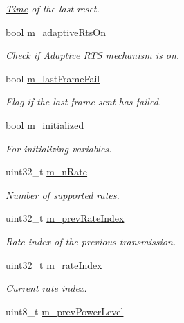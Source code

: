 \begin{DoxyCompactItemize}
\begin{DoxyCompactList}\small\item\em \hyperlink{classns3_1_1Time}{Time} of the last reset. \end{DoxyCompactList}\item 
bool \hyperlink{structns3_1_1RrpaaWifiRemoteStation_aadd0a82c0315fef3f1ae567bed1612c2}{m\+\_\+adaptive\+Rts\+On}
\begin{DoxyCompactList}\small\item\em Check if Adaptive R\+TS mechanism is on. \end{DoxyCompactList}\item 
bool \hyperlink{structns3_1_1RrpaaWifiRemoteStation_ac3e75c02498f6e4f05e4cbc8d038b2e0}{m\+\_\+last\+Frame\+Fail}
\begin{DoxyCompactList}\small\item\em Flag if the last frame sent has failed. \end{DoxyCompactList}\item 
bool \hyperlink{structns3_1_1RrpaaWifiRemoteStation_a28f5b71d7c9a1b1d35b8763273e2c527}{m\+\_\+initialized}
\begin{DoxyCompactList}\small\item\em For initializing variables. \end{DoxyCompactList}\item 
uint32\+\_\+t \hyperlink{structns3_1_1RrpaaWifiRemoteStation_afd24ca662ce9d0a0a646cd455b801a54}{m\+\_\+n\+Rate}
\begin{DoxyCompactList}\small\item\em Number of supported rates. \end{DoxyCompactList}\item 
uint32\+\_\+t \hyperlink{structns3_1_1RrpaaWifiRemoteStation_a4c0e4468c26422633983d7411a8b4b71}{m\+\_\+prev\+Rate\+Index}
\begin{DoxyCompactList}\small\item\em Rate index of the previous transmission. \end{DoxyCompactList}\item 
uint32\+\_\+t \hyperlink{structns3_1_1RrpaaWifiRemoteStation_ad006a058d80633032d4751dada11dfa3}{m\+\_\+rate\+Index}
\begin{DoxyCompactList}\small\item\em Current rate index. \end{DoxyCompactList}\item 
uint8\+\_\+t \hyperlink{structns3_1_1RrpaaWifiRemoteStation_a6eafe125f9b0140f4ade76c58556b831}{m\+\_\+prev\+Power\+Level}

\end{DoxyCompactItemize}

